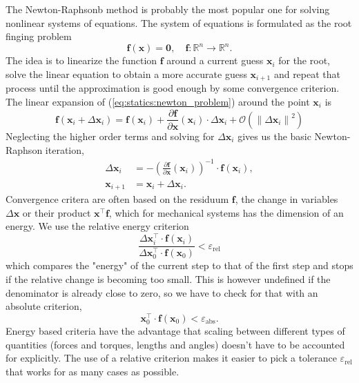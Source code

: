 The Newton-Raphsonb method is probably the most popular one for solving nonlinear systems of equations.
The system of equations is formulated as the root finging problem
%
\begin{equation}
\boldsymbol{f}(\boldsymbol{x}) = \boldsymbol{0},\quad \boldsymbol{f}: \mathbb{R}^n \rightarrow \mathbb{R}^n.\label{eq:statics:newton_problem}
\end{equation}
%
The idea is to linearize the function $\boldsymbol{f}$ around a current guess $\boldsymbol{x}_i$ for the root, solve the linear equation to obtain a more accurate guess $\boldsymbol{x}_{i+1}$ and repeat that process until the approximation is good enough by some convergence criterion.
The linear expansion of (\ref{eq:statics:newton_problem}) around the point $\boldsymbol{x}_i$ is
%
\begin{equation}
\boldsymbol{f}(\boldsymbol{x}_i + \Delta\boldsymbol{x}_i) = \boldsymbol{f}(\boldsymbol{x}_i) + \frac{\partial \boldsymbol{f}}{\partial \boldsymbol{x}}(\boldsymbol{x}_i) \cdot \Delta\boldsymbol{x}_i + \mathcal{O}(\left\lVert \Delta\boldsymbol{x}_i \right\rVert^2)
\end{equation}
%
Neglecting the higher order terms and solving for $\Delta\boldsymbol{x}_i$ gives us the basic Newton-Raphson iteration,
%
\begin{align}
\Delta\boldsymbol{x}_i &= -\left(\frac{\partial \boldsymbol{f}}{\partial \boldsymbol{x}}(\boldsymbol{x}_i)\right)^{-1} \cdot \boldsymbol{f}(\boldsymbol{x}_i),\label{eq:statics:newton_iteration_1} \\
\boldsymbol{x}_{i+1} &= \boldsymbol{x}_i + \Delta\boldsymbol{x}_i.\label{eq:statics:newton_iteration_2}
\end{align}
%
Convergence critera are often based on the residuum $\boldsymbol{f}$, the change in variables $\Delta \boldsymbol{x}$ or their product $\boldsymbol{x}^\intercal \boldsymbol{f}$, which for mechanical systems has the dimension of an energy.
We use the relative energy criterion
%
\begin{equation}
\frac{\Delta\boldsymbol{x}_i^\intercal \cdot \boldsymbol{f}(\boldsymbol{x}_i)}{\Delta\boldsymbol{x}_0^\intercal \cdot \boldsymbol{f}(\boldsymbol{x}_0)} < \varepsilon_\mathrm{rel}
\end{equation}
%
which compares the "energy" of the current step to that of the first step and stops if the relative change is becoming too small.
This is however undefined if the denominator is already close to zero, so we have to check for that with an absolute criterion,
%
\begin{equation}
\boldsymbol{x}_0^\intercal \cdot \boldsymbol{f}(\boldsymbol{x}_0) < \varepsilon_\mathrm{abs}.
\end{equation}
%
Energy based criteria have the advantage that scaling between different types of quantities (forces and torques, lengths and angles) doesn't have to be accounted for explicitly.
The use of a relative criterion makes it easier to pick a tolerance $\varepsilon_\mathrm{rel}$ that works for as many cases as possible.

